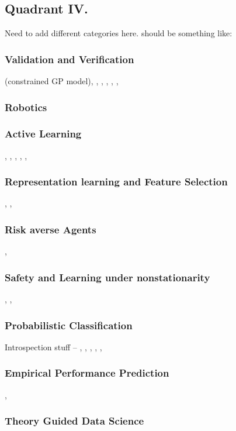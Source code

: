 \subsection{Quadrant IV.}
Need to add different categories here. should be something like:
\subsubsection{Validation and Verification} \cite{Da_Veiga2012-gh} (constrained GP model), \cite{Da_Silva2016-qb}, \cite{Nishi2016-zq}, \cite{Hadfield-Menell2016-ws}, \cite{Weng_Wong2014-tj}, \cite{Conner2007-uw}, 
\subsubsection{Robotics} \cite{Tellex2012-hn}
\subsubsection{Active Learning} \cite{Paul2011-vr}, \cite{Holub2008-pe}, \cite{Joshi2009-ws}, \cite{Kapoor2010-cy}, \cite{Triebel2013-ow}, \cite{MacKay1992-sp}
\subsubsection{Representation learning and Feature Selection} \cite{Bengio2013-uv}, \cite{Guyon2003-fj}, \cite{Haury2011-zi}
\subsubsection{Risk averse Agents} \cite{Curran2016-ij},  \cite{Lipton2016-dq}
\subsubsection{Safety and Learning under nonstationarity} \cite{Sugiyama2013-ci}, \cite{Garcia2015-rs},\cite{Quinonero-Candela2009-fj}
\subsubsection{Probabilistic Classification}
Introspection stuff -- \cite{Grimmett2013-gj}, \cite{Triebel2013-ku}, \cite{Triebel2016-kj}, \cite{Berczi2015-rd}, \cite{Grimmett2016-yc}, \cite{Dequaire2016-kh}
\subsubsection{Empirical Performance Prediction} \cite{Hutter2006-ak}, \cite{Leyton-Brown2009-yr}
\subsubsection{Theory Guided Data Science} \cite{Faghmous2014-og}
